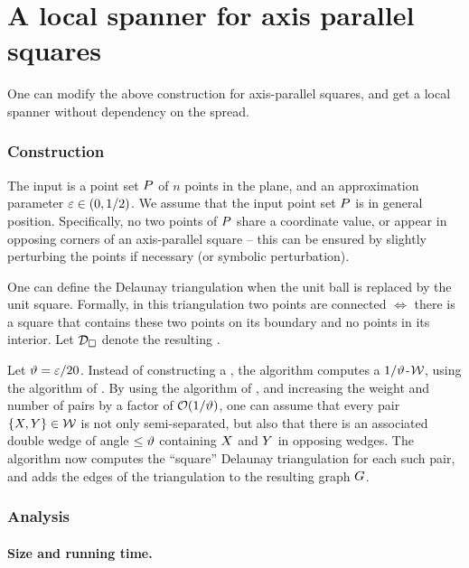 \documentclass[12pt]{article}%
\begin{document}
\section{A local spanner for axis parallel squares}
 One can modify the above construction for
axis-parallel squares, and get a local spanner without dependency on
the spread.

\subsubsection{Construction}

The input is a point set $P$ of $n$ points in the plane, and an
approximation parameter $\varepsilon \in (0,1/2)$.  We assume that the input
point set $P$ is in general position. Specifically, no two points of
$P$ share a coordinate value, or appear in opposing corners of an
axis-parallel square -- this can be ensured by slightly perturbing the
points if necessary (or symbolic perturbation).


One can define the Delaunay triangulation when the unit ball is
replaced by the unit square. Formally, in this triangulation two
points are connected $\iff$ there is a square that contains these two
points on its boundary and no points in its interior. Let
$\mathcal{D}_\square$ denote the resulting .

Let $\vartheta = \varepsilon/20$.  Instead of constructing a \WSPD, the algorithm
computes a $1/\vartheta$-\SSPD $\mathcal{W}$, using the algorithm of
. By using the algorithm of ,
and increasing the weight and number of pairs by a factor of
$\mathcal{O}(1/\vartheta)$, one can assume that every pair
$\{ X, Y \} \in \mathcal{W}$ is not only semi-separated, but also that
there is an associated double wedge of angle $\leq \vartheta$ containing
$X$ and $Y$ in opposing wedges.  The algorithm now computes the
``square'' Delaunay triangulation for each such pair, and adds the
edges of the triangulation to the resulting graph $G$.



\subsubsection{Analysis}

\paragraph{Size and running time.}
\end{document}
